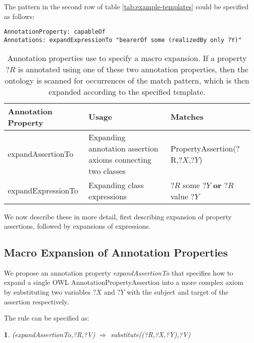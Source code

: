 \documentclass{llncs}
\newtheorem{exprule}{}[section]
\begin{document}
The pattern in the second row of table \ref{tab:example-templates}
could be specified as follows:

\begin{verbatim}
AnnotationProperty: capableOf
Annotations: expandExpressionTo "bearerOf some (realizedBy only ?Y)"
\end{verbatim}

  \begin{table}
    \begin{tabular}{ | p{3.2cm} | p{4.5cm} | p{4.5cm} | }
      \hline 
      \textbf{Annotation Property} & \textbf{Usage} & \textbf{Matches} \\

      \hline
      expandAssertionTo & Expanding annotation assertion axioms connecting two classes & PropertyAssertion(?R,$?X$,$?Y$) \\

      \hline
      expandExpressionTo & Expanding class expressions & 
      $?R$ some $?Y$ \textbf{or} \newline
      $?R$ value $?Y$ \\

      \hline
    \end{tabular}
    \caption{Annotation properties use to specify a macro
      expansion. If a property $?R$ is annotated using one of these
      two annotation properties, then the ontology is scanned for
      occurrences of the match pattern, which is then expanded
      according to the specified template.}
    \label{tab:macro-expansion}
  \end{table}

We now describe these in more detail, first describing expansion of
property assertions, followed by expansions of expressions.

\subsection{Macro Expansion of Annotation Properties}

We propose an annotation property \emph{expandAssertionTo} that
specifies how to expand a single OWL AnnotationPropertyAssertion into a more
complex axiom by substituting two variables $?X$ and $?Y$ with the
subject and target of the assertion respectively.

The rule can be specified as:

\begin{exprule}\label{exp-pa}
(expandAssertionTo,?R,?V)  $\Rightarrow$ \newline
 substitute((?R,?X,?Y),?V)
\end{exprule}
\end{document}
